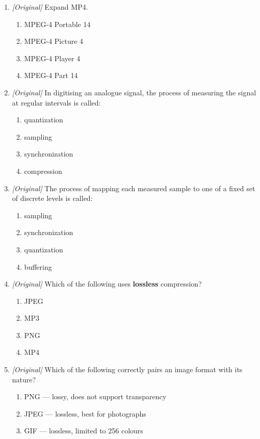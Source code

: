 \begin{enumerate}[label=\textbf{Q\arabic*.}, leftmargin=*]
\begin{enumerate}[label=\Alph*.]
  \end{enumerate}
\item \textit{[Original]} Expand MP4.
  \begin{enumerate}[label=\Alph*.]
    \item MPEG-4 Portable 14
    \item MPEG-4 Picture 4
    \item MPEG-4 Player 4
    \item MPEG-4 Part 14
  \end{enumerate}
\item \textit{[Original]} In digitising an analogue signal, the process of
  measuring the signal at regular intervals is called:
  \begin{enumerate}[label=\Alph*.]
    \item quantization
    \item sampling
    \item synchronization
    \item compression
  \end{enumerate}
\item \textit{[Original]} The process of mapping each measured sample to one of
  a fixed set of discrete levels is called:
  \begin{enumerate}[label=\Alph*.]
    \item sampling
    \item synchronization
    \item quantization
    \item buffering
  \end{enumerate}
\item \textit{[Original]} Which of the following uses \textbf{lossless}
  compression?
  \begin{enumerate}[label=\Alph*.]
    \item JPEG
    \item MP3
    \item PNG
    \item MP4
  \end{enumerate}
\item \textit{[Original]} Which of the following correctly pairs an image
  format with its nature?
  \begin{enumerate}[label=\Alph*.]
    \item PNG --- lossy, does not support transparency
    \item JPEG --- lossless, best for photographs
    \item GIF --- lossless, limited to 256 colours

\end{enumerate}
\end{enumerate}
